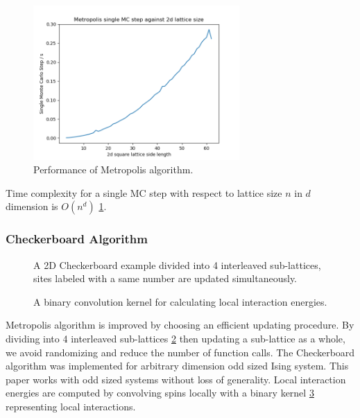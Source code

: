 \documentclass[%
showkeys,
bibnotes,
amsmath,amssymb,
floatfix,
]{revtex4-1}
\begin{document}
\begin{figure}[H] \centering
	\includegraphics[width=0.7\textwidth]{../figures/metropolis_performance}
	\caption{\label{fig:metropolis_performance} Performance of Metropolis algorithm.}
\end{figure}

Time complexity for a single MC step with respect to lattice size $n$ in $d$ dimension is $O(n^{d})$ \ref{fig:metropolis_performance}.

\subsubsection{\label{sec:mc:checker}Checkerboard Algorithm}

\begin{figure}[H] \centering
	\caption{\label{fig:checkerboard} A 2D Checkerboard example divided into 4 interleaved sub-lattices, sites labeled with a same number are updated simultaneously.}
\end{figure}

\begin{figure}[H] \centering
	\caption{\label{fig:binary_kernel} A binary convolution kernel for calculating local interaction energies.}
\end{figure}

Metropolis algorithm is improved by choosing an efficient updating procedure. By dividing into 4 interleaved sub-lattices \ref{fig:checkerboard} then updating a sub-lattice as a whole, we avoid randomizing and reduce the number of function calls. The Checkerboard algorithm was implemented for arbitrary dimension odd sized Ising system. This paper works with odd sized systems without loss of generality. Local interaction energies are computed by convolving spins locally with a binary kernel \ref{fig:binary_kernel} representing local interactions.
\end{document}

